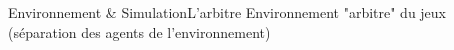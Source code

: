\begin{frame}{Environnement \& Simulation}{L'arbitre}
Environnement "arbitre" du jeux (séparation des agents de l'environnement)
\end{frame}